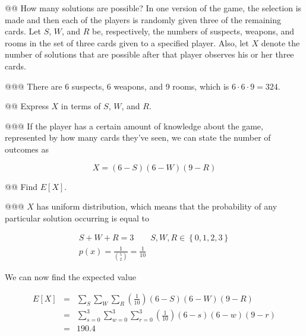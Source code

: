 \documentclass[11pt]{article}\usepackage[]{graphicx}\usepackage[]{xcolor}
\begin{document}
\begin{easylist}[enumerate]
    @@ How many solutions are possible? In one version of the game, the selection is made and then each of the players
    is randomly given three of the remaining cards. Let $S$, $W$, and $R$ be, respectively, the numbers of suspects,
    weapons, and rooms in the set of three cards given to a specified player. Also, let $X$ denote the number of
    solutions that are possible after that player observes his or her three cards.

    @@@ There are 6 suspects, 6 weapons, and 9 rooms, which is $6 \cdot 6 \cdot 9 = 324$.

    @@ Express $X$ in terms of $S$, $W$, and $R$.

    @@@ If the player has a certain amount of knowledge about the game, represented by how many cards they've seen, we
    can state the number of outcomes as

    \begin{equation}
        X = \left( 6 - S \right)\left( 6 - W \right)\left( 9 - R \right)
    \end{equation}

    @@ Find $E[X]$.

    @@@ $X$ has uniform distribution, which means that the probability of any particular solution occurring is equal to

    \begin{equation}
        \begin{aligned}
            S + W + R = 3 \qquad S,W,R \in \left\{ 0, 1, 2, 3 \right\}\\
            p(x) = \frac{1}{\binom{5}{2} } = \frac{1}{10}
        \end{aligned}
    \end{equation}

    We can now find the expected value

    \begin{equation}
        \begin{aligned}
            E[X] &=& \sum\limits_S
                       \sum\limits_W
                       \sum\limits_R
                       \left( \frac{1}{10} \right)(6-S)(6-W)(9-R)\\
                 &=& \sum_{s=0}^3
                       \sum_{w=0}^3
                       \sum_{r=0}^3
                       \left( \frac{1}{10} \right)(6-s)(6-w)(9-r)\\
                &=& 190.4
        \end{aligned}
    \end{equation}


\end{easylist}
\end{document}
